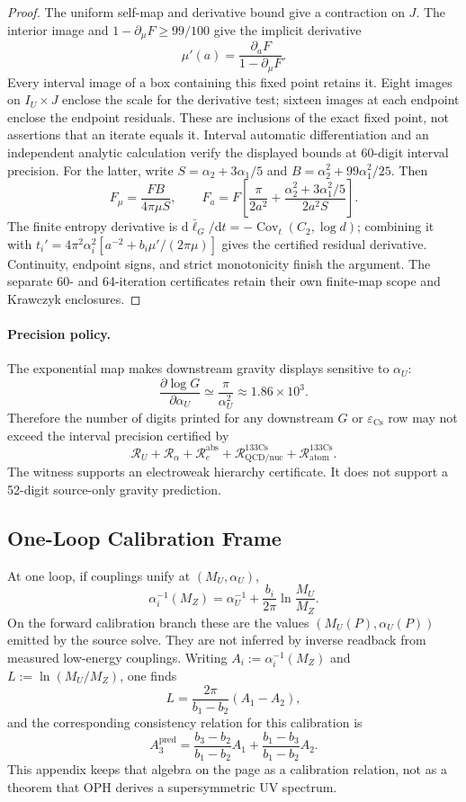 \begin{proof}
The uniform self-map and derivative bound give a contraction on $J$.
The interior image and $1-\partial_\mu F\ge99/100$ give the implicit derivative
\[
 \mu'(a)=\frac{\partial_a F}{1-\partial_\mu F}.
\]
Every interval image of a box containing this fixed point retains it.
Eight images on $I_U\times J$ enclose the scale for the derivative test;
sixteen images at each endpoint enclose the endpoint residuals. These are
inclusions of the exact fixed point, not assertions that an iterate equals it.
Interval automatic differentiation and an independent analytic calculation
verify the displayed bounds at 60-digit interval precision. For the latter,
write $S=\alpha_2+3\alpha_1/5$ and
$B=\alpha_2^2+99\alpha_1^2/25$. Then
\[
 F_\mu=\frac{FB}{4\pi\mu S},\qquad
 F_a=F\left[\frac{\pi}{2a^2}
 +\frac{\alpha_2^2+3\alpha_1^2/5}{2a^2S}\right].
\]
The finite entropy derivative is
$\mathrm d\bar\ell_G/\mathrm dt=-\operatorname{Cov}_t(C_2,\log d)$;
combining it with
$t_i'=4\pi^2\alpha_i^2[a^{-2}+b_i\mu'/(2\pi\mu)]$
gives the certified residual derivative. Continuity, endpoint signs, and
strict monotonicity finish the argument. The separate 60- and 64-iteration
certificates retain their own finite-map scope and Krawczyk enclosures.
\end{proof}

\paragraph{Precision policy.}
The exponential map makes downstream gravity displays sensitive to \(\alpha_U\):
\[
\frac{\partial\log G}{\partial \alpha_U}
\simeq
\frac{\pi}{\alpha_U^2}
\approx
1.86\times10^3.
\]
Therefore the number of digits printed for any downstream \(G\) or \(\varepsilon_{\mathrm{Cs}}\)
row may not exceed the interval precision certified by
\[
\mathcal R_U+\mathcal R_\alpha+\mathcal R_e^{\mathrm{abs}}
+\mathcal R_{\mathrm{QCD/nuc}}^{133\mathrm{Cs}}
+\mathcal R_{\mathrm{atom}}^{133\mathrm{Cs}}.
\]
The witness supports an electroweak hierarchy certificate. It does not support a 52-digit
source-only gravity prediction.

\subsection{One-Loop Calibration Frame}

At one loop, if couplings unify at \((M_U,\alpha_U)\),
\[
\alpha_i^{-1}(M_Z)=\alpha_U^{-1}+\frac{b_i}{2\pi}\ln\frac{M_U}{M_Z}.
\]
On the forward calibration branch these are the values
\((M_U(P),\alpha_U(P))\) emitted by the source solve. They are not inferred by
inverse readback from measured low-energy couplings.
Writing \(A_i:=\alpha_i^{-1}(M_Z)\) and \(L:=\ln(M_U/M_Z)\), one finds
\[
L=\frac{2\pi}{b_1-b_2}(A_1-A_2),
\]
and the corresponding consistency relation for this calibration is
\[
A_3^{\mathrm{pred}}
=
\frac{b_3-b_2}{b_1-b_2}A_1
+
\frac{b_1-b_3}{b_1-b_2}A_2.
\]
This appendix keeps that algebra on the page as a calibration relation, not as a theorem that OPH
derives a supersymmetric UV spectrum.

